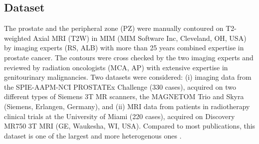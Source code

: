 \subsection{Dataset}
\label{subsec:dataset}
The prostate and the peripheral zone (PZ) were manually contoured on T2-weighted Axial MRI (T2W) in MIM (MIM Software Inc, Cleveland, OH, USA) by imaging experts (RS, ALB) with more than 25 years combined expertise in prostate cancer. The contours were cross checked by the two imaging experts and reviewed by radiation oncologists (MCA, AP) with extensive expertise in genitourinary malignancies. Two datasets were considered: (i) imaging data from the SPIE-AAPM-NCI PROSTATEx Challenge \cite{deukwoo_classification_2018} (330 cases), acquired on two different types of Siemens 3T MR scanners, the MAGNETOM Trio and Skyra (Siemens, Erlangen, Germany), and  (ii) MRI data from patients in radiotherapy clinical trials at the University of Miami (220 cases), acquired on Discovery MR750 3T MRI (GE, Waukesha, WI, USA).  Compared to most publications, this dataset is one of the largest and more heterogenous ones \cite{anneke,litjens2014evaluation,chowdhury2012concurrent,toth2012multifeature,4_klein2008automatic,5_cheng2014atlas,6_xie2014low,7_tian2015fully,8_korsager2015use,jia20183d}.

